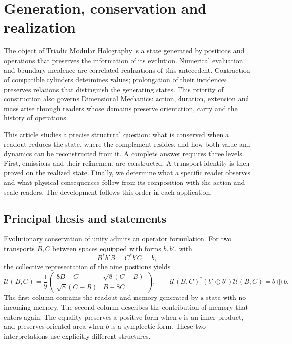 \section{Generation, conservation and realization}
\label{nuclear:introduccion}
The object of Triadic Modular Holography is a state generated by positions and operations that preserves the information of its evolution. Numerical evaluation and boundary incidence are correlated realizations of this antecedent. Contraction of compatible cylinders determines values; prolongation of their incidences preserves relations that distinguish the generating states. This priority of construction also governs Dimensional Mechanics: action, duration, extension and mass arise through readers whose domains preserve orientation, carry and the history of operations.

This article studies a precise structural question: what is conserved when a readout reduces the state, where the complement resides, and how both value and dynamics can be reconstructed from it. A complete answer requires three levels. First, emissions and their refinement are constructed. A transport identity is then proved on the realized state. Finally, we determine what a specific reader observes and what physical consequences follow from its composition with the action and scale readers. The development follows this order in each application.

\subsection{Principal thesis and statements}
Evolutionary conservation of unity admits an operator formulation. For two transports \(B,C\) between spaces equipped with forms \(b,b'\), with
\[
B^{*}b'B=C^{*}b'C=b,
\]
the collective representation of the nine positions yields
\begin{equation}
\mathcal U(B,C)=\frac19
\begin{pmatrix}8B+C&\sqrt8(C-B)\\ \sqrt8(C-B)&B+8C\end{pmatrix},
\qquad
\mathcal U(B,C)^*(b'\oplus b')\mathcal U(B,C)=b\oplus b.
\label{nuclear:eq:rectora}
\end{equation}
The first column contains the readout and memory generated by a state with no incoming memory. The second column describes the contribution of memory that enters again. The equality preserves a positive form when \(b\) is an inner product, and preserves oriented area when \(b\) is a symplectic form. These two interpretations use explicitly different structures.

